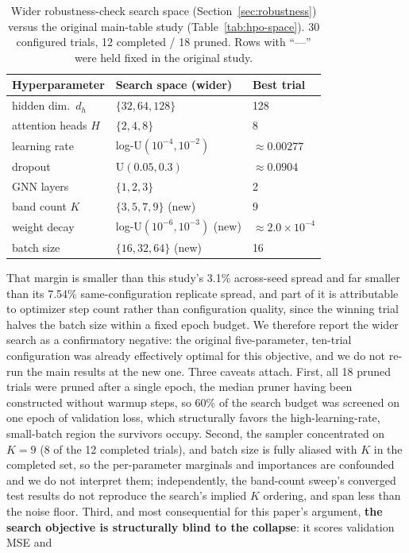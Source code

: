 \documentclass[journal]{IEEEtran}
\begin{document}
\begin{table}[t]
\centering
\caption{Wider robustness-check search space (Section~\ref{sec:robustness}) versus the original main-table study (Table~\ref{tab:hpo-space}). 30 configured trials, 12 completed / 18 pruned. Rows with ``---'' were held fixed in the original study.}
\label{tab:hpo-wide-space}
\begin{tabular}{lll}
\toprule
Hyperparameter & Search space (wider) & Best trial \\
\midrule
hidden dim.\ $d_h$ & $\{32, 64, 128\}$ & 128 \\
attention heads $H$ & $\{2, 4, 8\}$ & 8 \\
learning rate & log-U$(10^{-4}, 10^{-2})$ & $\approx 0.00277$ \\
dropout & U$(0.05, 0.3)$ & $\approx 0.0904$ \\
GNN layers & $\{1, 2, 3\}$ & 2 \\
band count $K$ & $\{3, 5, 7, 9\}$ (new) & 9 \\
weight decay & log-U$(10^{-6}, 10^{-3})$ (new) & $\approx 2.0{\times}10^{-4}$ \\
batch size & $\{16, 32, 64\}$ (new) & 16 \\
\bottomrule
\end{tabular}
\end{table} That margin is
smaller than this study's 3.1\% across-seed spread and far smaller than its 7.54\%
same-configuration replicate spread, and part of it is attributable to optimizer
step count rather than configuration quality, since the winning trial halves the
batch size within a fixed epoch budget. We therefore report the wider search as a
confirmatory negative: the original five-parameter, ten-trial configuration was
already effectively optimal for this objective, and we do not re-run the main
results at the new one. Three caveats attach. First, all 18 pruned trials were
pruned after a single epoch, the median pruner having been constructed without
warmup steps, so 60\% of the search budget was screened on one epoch of validation
loss, which structurally favors the high-learning-rate, small-batch region the
survivors occupy. Second, the sampler concentrated on $K=9$ (8 of the 12 completed
trials), and batch size is fully aliased with $K$ in the completed set, so the
per-parameter marginals and importances are confounded and we do not interpret
them; independently, the band-count sweep's converged test results do not
reproduce the search's implied $K$ ordering, and span less than the noise floor.
Third, and most consequential for this paper's argument, \textbf{the search
objective is structurally blind to the collapse}: it scores validation MSE and
\end{document}
